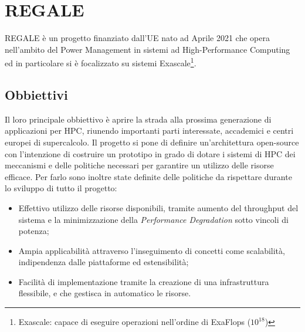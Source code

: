 \chapter{REGALE}\label{chap:4_REGALE}
REGALE\cite{REGALE} è un progetto finanziato dall'UE\cite{ue_REGALE} nato ad Aprile 2021 che opera nell'ambito del Power Management in sistemi ad High-Performance Computing ed in particolare si è focalizzato su sistemi Exascale\footnote{Exascale: capace di eseguire operazioni nell'ordine di ExaFlops ($10^{18}$)}.

\section{Obbiettivi}
Il loro principale obbiettivo è aprire la strada alla prossima generazione di applicazioni per HPC, riunendo importanti parti interessate, accademici e centri europei di supercalcolo. Il progetto si pone di definire un'architettura open-source con l'intenzione di costruire un prototipo in grado di dotare i sistemi di HPC dei meccanismi e delle politiche necessari per garantire un utilizzo delle risorse efficace\cite{ue_REGALE}. Per farlo sono inoltre state definite delle politiche da rispettare durante lo sviluppo di tutto il progetto:
\begin{itemize}
    \item Effettivo utilizzo delle risorse disponibili, tramite aumento del throughput del sistema e la minimizzazione della \emph{Performance Degradation} sotto vincoli di potenza;
    \item Ampia applicabilità attraverso l'inseguimento di concetti come scalabilità, indipendenza dalle piattaforme ed estensibilità;
    \item Facilità di implementazione tramite la creazione di una infrastruttura flessibile, e che gestisca in automatico le risorse.
\end{itemize}


